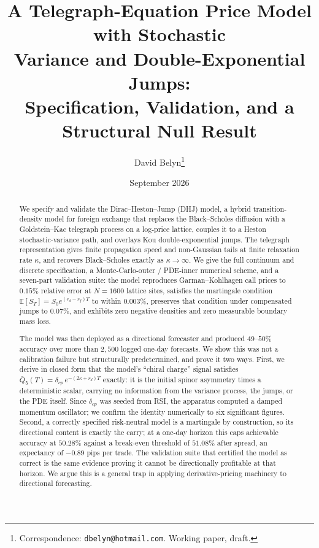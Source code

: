 \documentclass[11pt]{article}
\title{\vspace{-2.5em}\bfseries A Telegraph-Equation Price Model with Stochastic\\
Variance and Double-Exponential Jumps:\\
Specification, Validation, and a Structural Null Result}
\author{David Belyn\thanks{Correspondence: \texttt{dbelyn@hotmail.com}. Working paper, draft.}}
\date{September 2026}
\begin{document}
\maketitle
\vspace{-1.8em}

\begin{abstract}
\noindent
We specify and validate the Dirac--Heston--Jump (DHJ) model, a hybrid
transition-density model for foreign exchange that replaces the
Black--Scholes diffusion with a Goldstein--Kac telegraph process on a
log-price lattice, couples it to a Heston stochastic-variance path, and
overlays Kou double-exponential jumps. The telegraph representation gives
finite propagation speed and non-Gaussian tails at finite relaxation rate
$\kappa$, and recovers Black--Scholes exactly as $\kappa \to \infty$. We give
the full continuum and discrete specification, a Monte-Carlo-outer /
PDE-inner numerical scheme, and a seven-part validation suite: the model
reproduces Garman--Kohlhagen call prices to $0.15\%$ relative error at
$N=1600$ lattice sites, satisfies the martingale condition
$\mathbb{E}[S_T]=S_0 e^{(r_d-r_f)T}$ to within $0.003\%$, preserves that
condition under compensated jumps to $0.07\%$, and exhibits zero negative
densities and zero measurable boundary mass loss.

The model was then deployed as a directional forecaster and produced
$49$--$50\%$ accuracy over more than $2{,}500$ logged one-day forecasts. We
show this was not a calibration failure but structurally predetermined, and
prove it two ways. First, we derive in closed form that the model's
``chiral charge'' signal satisfies
$\bar{Q}_5(T) = \delta_{cp}\,e^{-(2\kappa+r_d)T}$ exactly: it is the initial
spinor asymmetry times a deterministic scalar, carrying no information from
the variance process, the jumps, or the PDE itself. Since $\delta_{cp}$ was
seeded from RSI, the apparatus computed a damped momentum oscillator; we
confirm the identity numerically to six significant figures. Second, a
correctly specified risk-neutral model is a martingale by construction, so
its directional content is exactly the carry; at a one-day horizon this caps
achievable accuracy at $50.28\%$ against a break-even threshold of $51.08\%$
after spread, an expectancy of $-0.89$ pips per trade. The validation suite
that certified the model as correct is the same evidence proving it cannot
be directionally profitable at that horizon. We argue this is a general trap
in applying derivative-pricing machinery to directional forecasting.
\end{abstract}
\end{document}
